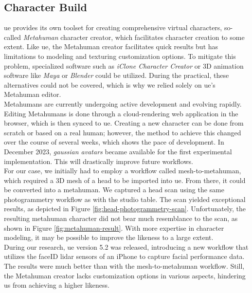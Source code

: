 \documentclass[
  a4paper,  %
  twoside,  %
  bibliography=totoc,
  headsepline,
  cleardoublepage=empty,
  parskip=half,
  draft=false
]{scrbook}
\begin{document}
\subsection*{Character Build}
\gls{ue} provides its own toolset for creating comprehensive virtual characters, so-called \textit{Metahuman} character creator, which facilitates character creation to some extent. Like \gls{ue}, the Metahuman creator facilitates quick results but has limitations to modeling and texturing customization options. To mitigate this problem, specialized software such as \textit{iClone Character Creator} or 3D animation software like \textit{Maya} or \textit{Blender} could be utilized. During the practical, these alternatives could not be covered, which is why we relied solely on \gls{ue}'s Metahuman editor. \\
Metahumans are currently undergoing active development and evolving rapidly. Editing Metahumans is done through a cloud-rendering web application in the browser, which is then synced to \gls{ue}. Creating a new character can be done from scratch or based on a real human; however, the method to achieve this changed over the course of several weeks, which shows the pace of development. In December 2023, \textit{gaussian avatars} became available for the first experimental implementation. This will drastically improve future workflows. \\
For our case, we initially had to employ a workflow called mesh-to-metahuman, which required a 3D mesh of a head to be imported into \gls{ue}. From there, it could be converted into a metahuman. We captured a head scan using the same photogrammetry workflow as with the studio table. The scan yielded exceptional results, as depicted in Figure \ref{fig:head-photogrammetry-scan}. Unfortunately, the resulting metahuman character did not bear much resemblance to the scan, as shown in Figure \ref{fig:metahuman-result}. With more expertise in character modeling, it may be possible to improve the likeness to a large extent. \\
During our research, \gls{ue} version 5.2 was released, introducing a new workflow that utilizes the faceID lidar sensors of an iPhone to capture facial performance data. The results were much better than with the mesh-to-metahuman workflow. Still, the Metahuman creator lacks customization options in various aspects, hindering us from achieving a higher likeness.
\end{document}
